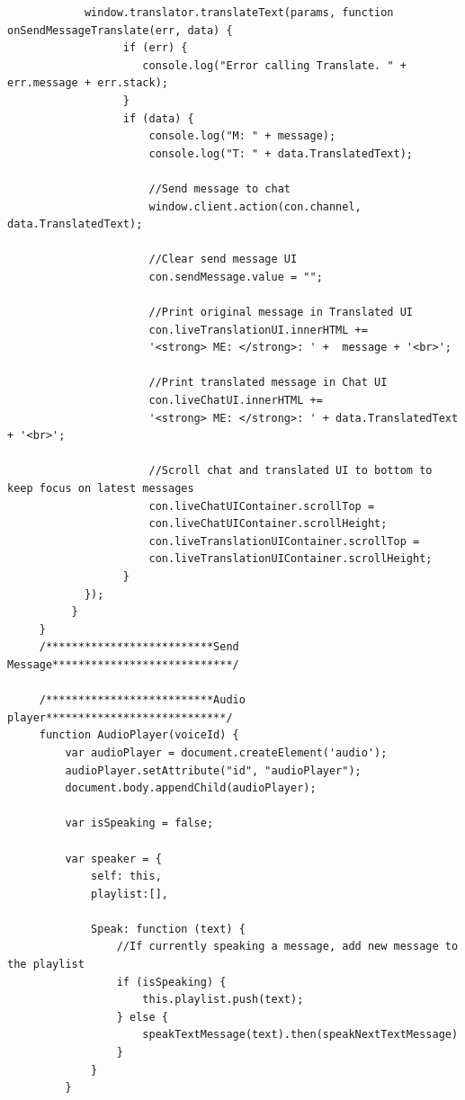 \documentclass[runningheads]{llncs}
\begin{document}
{\begin{verbatim}
            window.translator.translateText(params, function onSendMessageTranslate(err, data) {
                  if (err) {
                     console.log("Error calling Translate. " + err.message + err.stack);
                  }
                  if (data) {
                      console.log("M: " + message);
                      console.log("T: " + data.TranslatedText);

                      //Send message to chat
                      window.client.action(con.channel, data.TranslatedText);

                      //Clear send message UI
                      con.sendMessage.value = "";

                      //Print original message in Translated UI
                      con.liveTranslationUI.innerHTML +=
                      '<strong> ME: </strong>: ' +  message + '<br>';

                      //Print translated message in Chat UI
                      con.liveChatUI.innerHTML += 
                      '<strong> ME: </strong>: ' + data.TranslatedText + '<br>';

                      //Scroll chat and translated UI to bottom to keep focus on latest messages
                      con.liveChatUIContainer.scrollTop = 
                      con.liveChatUIContainer.scrollHeight;
                      con.liveTranslationUIContainer.scrollTop = 
                      con.liveTranslationUIContainer.scrollHeight;
                  }
            });
          }
     }
     /**************************Send Message****************************/

     /**************************Audio player****************************/
     function AudioPlayer(voiceId) {
         var audioPlayer = document.createElement('audio');
         audioPlayer.setAttribute("id", "audioPlayer");
         document.body.appendChild(audioPlayer);

         var isSpeaking = false;

         var speaker = {
             self: this,
             playlist:[],

             Speak: function (text) {
                 //If currently speaking a message, add new message to the playlist
                 if (isSpeaking) {
                     this.playlist.push(text);
                 } else {
                     speakTextMessage(text).then(speakNextTextMessage)
                 }
             }
         }


\end{verbatim}}
\end{document}
